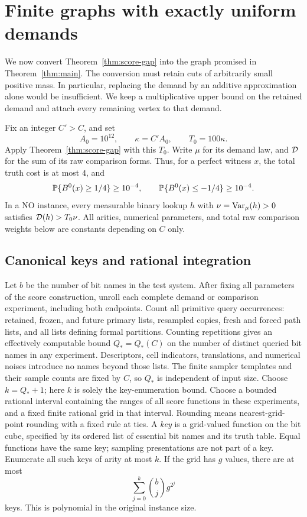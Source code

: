 \section{Finite graphs with exactly uniform demands}\label{sec:finite-graph}

We now convert Theorem~\ref{thm:score-gap} into the graph promised in
Theorem~\ref{thm:main}.  The conversion must retain cuts of arbitrarily small
positive mass.  In particular, replacing the demand by an additive approximation
alone would be insufficient.  We keep a multiplicative upper bound on the
retained demand and attach every remaining vertex to that demand.

Fix an integer $C'>C$, and set
\[
 A_0=10^{12},\qquad \kappa=C'A_0,\qquad T_0=100\kappa.
\]
Apply Theorem~\ref{thm:score-gap} with this $T_0$.  Write $\mu$ for its demand
law, and $\mathcal D$ for the sum of its raw comparison forms.  Thus, for a perfect
witness $x$, the total truth cost is at most $4$, and
\begin{equation}\label{eq:demand-tails-finite}
 \mathbb P\{B^0(x)\ge1/4\}\ge10^{-4},\qquad
 \mathbb P\{B^0(x)\le-1/4\}\ge10^{-4}.
\end{equation}
In a NO instance, every measurable binary lookup $h$ with
$\nu=\operatorname{Var}_\mu(h)>0$ satisfies $\mathcal D(h)>T_0\nu$.
All arities, numerical parameters, and total raw comparison weights below
are constants depending on $C$ only.

\subsection{Canonical keys and rational integration}

Let $b$ be the number of bit names in the test system. After fixing all
parameters of the score construction, unroll each complete demand or
comparison experiment, including both endpoints. Count all primitive
query occurrences: retained, frozen, and future primary lists, resampled
copies, fresh and forced path lists, and all lists defining formal
partitions. Counting repetitions gives an effectively computable bound
$Q_*=Q_*(C)$ on the number of distinct queried bit names in any experiment.
Descriptors, cell indicators, translations, and numerical noises introduce
no names beyond those lists. The finite sampler templates and their
sample counts are fixed by $C$, so $Q_*$ is independent of input size.
Choose $k=Q_*+1$; here $k$ is solely the key-enumeration bound.
Choose a bounded rational interval containing the ranges of all score
functions in these experiments, and a fixed finite rational grid in that
interval. Rounding means nearest-grid-point rounding
with a fixed rule at ties.  A \emph{key} is a grid-valued function on the bit
cube, specified by its ordered list of essential bit names and its truth
table.  Equal functions have the same key; sampling presentations are not
part of a key.  Enumerate all such keys of arity at most $k$.  If the grid
has $g$ values, there are at most
\[
 \sum_{j=0}^k\binom bj g^{2^j}
\]
keys.  This is polynomial in the original instance size.

